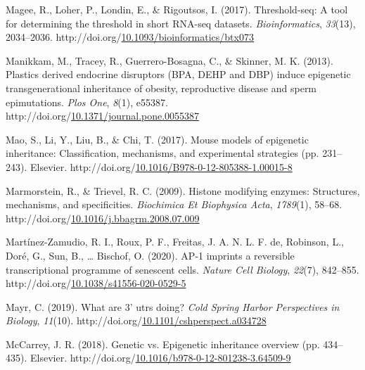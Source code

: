 \documentclass[12pt,twoside]{reedthesis}
\newlength{\cslhangindent}
\newenvironment{CSLReferences}[2] %
 {%
  \setlength{\parindent}{0pt}
  \ifodd #1 \everypar{\setlength{\hangindent}{\cslhangindent}}\ignorespaces\fi
  \ifnum #2 > 0
  \setlength{\parskip}{#2\baselineskip}
  \fi
 }%
 {}
\begin{document}
\begin{CSLReferences}{1}{0}
\leavevmode{}%
Magee, R., Loher, P., Londin, E., \& Rigoutsos, I. (2017). Threshold-seq: A tool for determining the threshold in short RNA-seq datasets. \emph{Bioinformatics}, \emph{33}(13), 2034--2036. http://doi.org/\href{https://doi.org/10.1093/bioinformatics/btx073}{10.1093/bioinformatics/btx073}

\leavevmode{}%
Manikkam, M., Tracey, R., Guerrero-Bosagna, C., \& Skinner, M. K. (2013). Plastics derived endocrine disruptors (BPA, DEHP and DBP) induce epigenetic transgenerational inheritance of obesity, reproductive disease and sperm epimutations. \emph{Plos One}, \emph{8}(1), e55387. http://doi.org/\href{https://doi.org/10.1371/journal.pone.0055387}{10.1371/journal.pone.0055387}

\leavevmode{}%
Mao, S., Li, Y., Liu, B., \& Chi, T. (2017). Mouse models of epigenetic inheritance: Classification, mechanisms, and experimental strategies (pp. 231--243). Elsevier. http://doi.org/\href{https://doi.org/10.1016/B978-0-12-805388-1.00015-8}{10.1016/B978-0-12-805388-1.00015-8}

\leavevmode{}%
Marmorstein, R., \& Trievel, R. C. (2009). Histone modifying enzymes: Structures, mechanisms, and specificities. \emph{Biochimica Et Biophysica Acta}, \emph{1789}(1), 58--68. http://doi.org/\href{https://doi.org/10.1016/j.bbagrm.2008.07.009}{10.1016/j.bbagrm.2008.07.009}

\leavevmode{}%
Martínez-Zamudio, R. I., Roux, P. F., Freitas, J. A. N. L. F. de, Robinson, L., Doré, G., Sun, B., \ldots{} Bischof, O. (2020). AP-1 imprints a reversible transcriptional programme of senescent cells. \emph{Nature Cell Biology}, \emph{22}(7), 842--855. http://doi.org/\href{https://doi.org/10.1038/s41556-020-0529-5}{10.1038/s41556-020-0529-5}

\leavevmode{}%
Mayr, C. (2019). What are 3' utrs doing? \emph{Cold Spring Harbor Perspectives in Biology}, \emph{11}(10). http://doi.org/\href{https://doi.org/10.1101/cshperspect.a034728}{10.1101/cshperspect.a034728}

\leavevmode{}%
McCarrey, J. R. (2018). Genetic vs. Epigenetic inheritance overview (pp. 434--435). Elsevier. http://doi.org/\href{https://doi.org/10.1016/b978-0-12-801238-3.64509-9}{10.1016/b978-0-12-801238-3.64509-9}


\end{CSLReferences}
\end{document}
